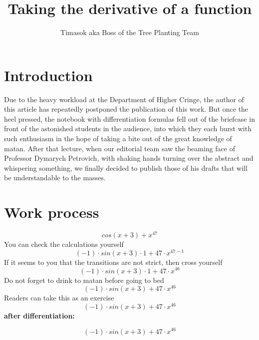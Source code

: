 \documentclass{article}
\title{\textbf{Taking the derivative of a function}}
\author{Timasok aka Boss of the Tree Planting Team}
\begin{document}
\maketitle
\section{Introduction}
Due to the heavy workload at the Department of Higher Cringe, the author of this article has repeatedly postponed the publication of this work. But once the heel pressed, the notebook with differentiation formulas fell out of the briefcase in front of the astonished students in the audience, into which they each burst with such enthusiasm in the hope of taking a bite out of the great knowledge of matan. After that lecture, when our editorial team saw the beaming face of Professor Dymarych Petrovich, with shaking hands turning over the abstract and whispering something, we finally decided to publish those of his drafts that will be understandable to the masses. \section{Work process}

$$
cos(x+3)+x^{47}
$$
You can check the calculations yourself
$$
(-1)\cdot sin(x+3)\cdot 1+47\cdot x^{47-1}
$$
If it seems to you that the transitions are not strict, then cross yourself
$$
(-1)\cdot sin(x+3)\cdot 1+47\cdot x^{46}
$$
Do not forget to drink to matan before going to bed
$$
(-1)\cdot sin(x+3)+47\cdot x^{46}
$$
Readers can take this as an exercise
$$
(-1)\cdot sin(x+3)+47\cdot x^{46}
$$
\textbf{after differentiation:}

$$
(-1)\cdot sin(x+3)+47\cdot x^{46}
$$
\end{document}
